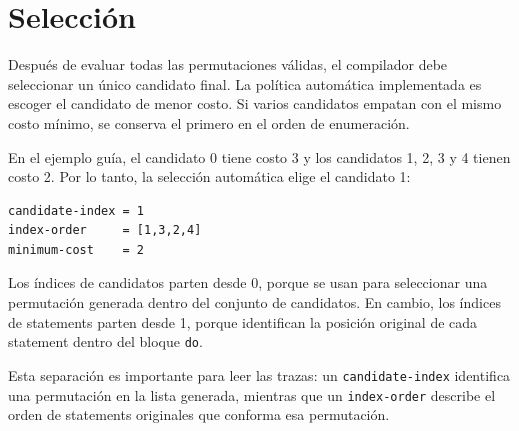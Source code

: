 
\section{Selección}

Después de evaluar todas las permutaciones válidas, el compilador debe seleccionar un único candidato final. La política automática implementada es escoger el candidato de menor costo. Si varios candidatos empatan con el mismo costo mínimo, se conserva el primero en el orden de enumeración.

En el ejemplo guía, el candidato 0 tiene costo 3 y los candidatos 1, 2, 3 y 4 tienen costo 2. Por lo tanto, la selección automática elige el candidato 1:

\begin{verbatim}
candidate-index = 1
index-order     = [1,3,2,4]
minimum-cost    = 2
\end{verbatim}

Los índices de candidatos parten desde 0, porque se usan para seleccionar una permutación generada dentro del conjunto de candidatos. En cambio, los índices de statements parten desde 1, porque identifican la posición original de cada statement dentro del bloque \texttt{do}.

Esta separación es importante para leer las trazas: un \texttt{candidate-index} identifica una permutación en la lista generada, mientras que un \texttt{index-order} describe el orden de statements originales que conforma esa permutación.
